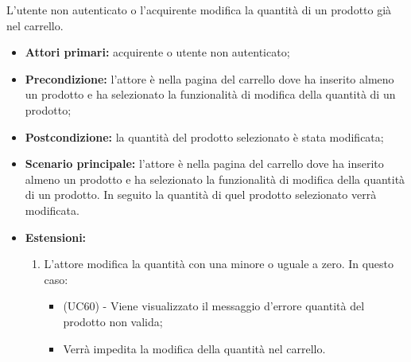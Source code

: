 
L'utente non autenticato o l'acquirente modifica la quantità di un prodotto già nel carrello.
\begin{itemize}
    \item \textbf{Attori primari:} acquirente o utente non autenticato;
    \item \textbf{Precondizione:} l'attore è nella pagina del carrello dove ha inserito almeno un prodotto e ha selezionato la funzionalità di modifica della quantità di un prodotto;
    \item \textbf{Postcondizione:} la quantità del prodotto selezionato è stata modificata;
    \item \textbf{Scenario principale:} l'attore è nella pagina del carrello dove ha inserito almeno un prodotto e ha selezionato la funzionalità di modifica della quantità di un prodotto. In seguito la quantità di quel prodotto selezionato verrà modificata.
    \item \textbf{Estensioni:}
    \begin{enumerate}[label=\lett]
        \item L'attore modifica la quantità con una minore o uguale a zero. In questo caso:
        \begin{itemize}
            \item (UC60) - Viene visualizzato il messaggio d'errore quantità del prodotto non valida;
            \item Verrà impedita la modifica della quantità nel carrello.
        \end{itemize}
    \end{enumerate}
\end{itemize}

